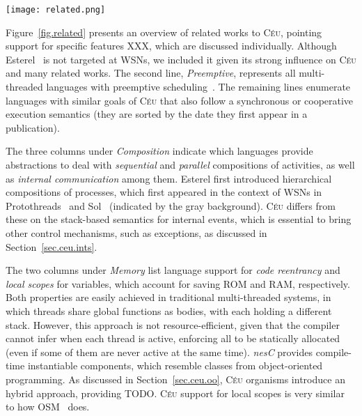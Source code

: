 \documentclass[10pt]{sensys-proc}
\newcommand{\CEU}{\textsc{C\'{e}u}\xspace}
\newcommand{\code}[1] {{\small{\texttt{#1}}}}
\begin{document}
\begin{figure*}[t]
\texttt{[image: related.png]}
\caption{ Table of features found in related works to \CEU.
\label{fig.related}
}
\end{figure*}

Figure~\ref{fig.related} presents an overview of related works to \CEU, 
pointing support for specific features XXX, which are discussed individually.
Although Esterel~\cite{esterel.ieee91} is not targeted at WSNs, we included it 
given its strong influence on \CEU and many related works.
The second line, \emph{Preemptive}, represents all multi-threaded languages 
with preemptive scheduling~\cite{wsn.mantisos,Y,Z}.
The remaining lines enumerate languages with similar goals of \CEU that also 
follow a synchronous or cooperative execution semantics (they are sorted by the 
date they first appear in a publication).

The three columns under \emph{Composition} indicate which languages provide
abstractions to deal with \emph{sequential} and \emph{parallel} compositions of 
activities, as well as \emph{internal communication} among them.
Esterel first introduced hierarchical compositions of processes, which first 
appeared in the context of WSNs in Protothreads~\cite{wsn.protothreads} and 
Sol~\cite{wsn.sol} (indicated by the gray background).
\CEU differs from these on the stack-based semantics for internal events, which 
is essential to bring other control mechanisms, such as exceptions, as 
discussed in Section~\ref{sec.ceu.ints}.


The two columns under \emph{Memory} list language support for \emph{code 
reentrancy} and \emph{local scopes} for variables, which account for saving ROM 
and RAM, respectively.
Both properties are easily achieved in traditional multi-threaded systems, in 
which threads share global functions as bodies, with each holding a different 
stack.
However, this approach is not resource-efficient, given that the compiler 
cannot infer when each thread is active, enforcing all to be statically 
allocated~\cite{wsn.mantisos,wsn.ocram} (even if some of them are never active 
at the same time).
\emph{nesC} provides compile-time instantiable components, which resemble 
classes from object-oriented programming.
As discussed in Section~\ref{sec.ceu.oo}, \CEU organisms introduce an hybrid 
approach, providing TODO.
\CEU support for local scopes is very similar to how OSM~\cite{wsn.osm} does.
\end{document}
